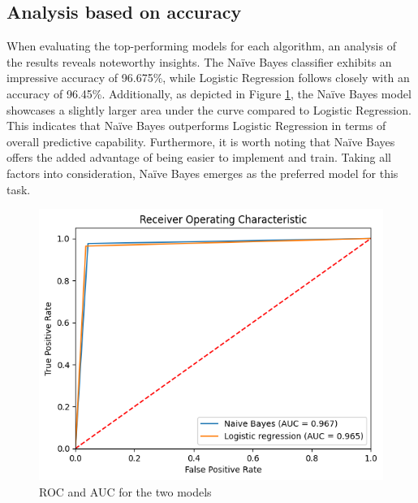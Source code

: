 \documentclass{class}
\begin{document}
\subsection{Analysis based on accuracy}
When evaluating the top-performing models for each algorithm, an analysis of the results reveals noteworthy insights.
The Naïve Bayes classifier exhibits an impressive accuracy of 96.675\%, while Logistic Regression follows closely with an accuracy of 96.45\%.
Additionally, as depicted in Figure \ref{fig-11}, the Naïve Bayes model showcases a slightly larger area under the curve compared to Logistic Regression.
This indicates that Naïve Bayes outperforms Logistic Regression in terms of overall predictive capability.
Furthermore, it is worth noting that Naïve Bayes offers the added advantage of being easier to implement and train.
Taking all factors into consideration, Naïve Bayes emerges as the preferred model for this task.

\begin{figure}[h]
    \centering
    \includegraphics[width=0.7\columnwidth]{images/comparison.png}
    \caption{ROC and AUC for the two models}
    \label{fig-11}
\end{figure}
\end{document}
